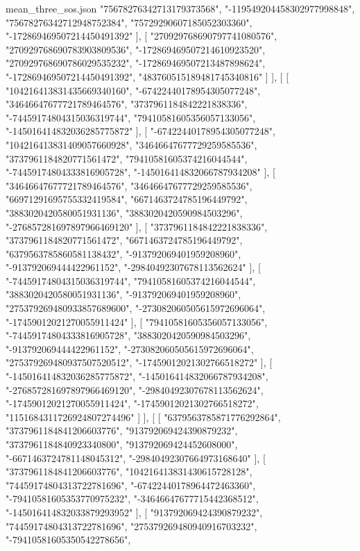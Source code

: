 \begin{filecontents*}[overwrite]{mean_three_sos.json}
    "75678276342713179373568",
    "-119549204458302977998848",
    "75678276342712948752384",
    "75729290607185052303360",
    "-172869469507214450491392"
   ],
   [
    "270929768690797741080576",
    "270929768690783903809536",
    "-172869469507214610923520",
    "270929768690786029535232",
    "-172869469507213487898624",
    "-172869469507214450491392",
    "483760515189481745340816"
   ]
  ],
  [
   [
    "104216413831435669340160",
    "-67422440178954305077248",
    "34646647677721789464576",
    "3737961184842221838336",
    "-74459174804315036319744",
    "79410581605356057133056",
    "-145016414832036285775872"
   ],
   [
    "-67422440178954305077248",
    "104216413831409057660928",
    "34646647677729259585536",
    "3737961184820771561472",
    "79410581605374216044544",
    "-74459174804333816905728",
    "-145016414832066787934208"
   ],
   [
    "34646647677721789464576",
    "34646647677729259585536",
    "66971291695755332419584",
    "6671463724785196449792",
    "3883020420580051931136",
    "3883020420590984503296",
    "-276857281697897966469120"
   ],
   [
    "3737961184842221838336",
    "3737961184820771561472",
    "6671463724785196449792",
    "6379563785860581138432",
    "-913792069401959208960",
    "-913792069444422961152",
    "-29840492307678113562624"
   ],
   [
    "-74459174804315036319744",
    "79410581605374216044544",
    "3883020420580051931136",
    "-913792069401959208960",
    "275379269480933857689600",
    "-273082060505615972696064",
    "-17459012021270055911424"
   ],
   [
    "79410581605356057133056",
    "-74459174804333816905728",
    "3883020420590984503296",
    "-913792069444422961152",
    "-273082060505615972696064",
    "275379269480937507520512",
    "-17459012021302766518272"
   ],
   [
    "-145016414832036285775872",
    "-145016414832066787934208",
    "-276857281697897966469120",
    "-29840492307678113562624",
    "-17459012021270055911424",
    "-17459012021302766518272",
    "1151684311726924807274496"
   ]
  ],
  [
   [
    "6379563785871776292864",
    "3737961184841206603776",
    "913792069424390879232",
    "3737961184840923340800",
    "913792069424452608000",
    "-6671463724781148045312",
    "-29840492307664973168640"
   ],
   [
    "3737961184841206603776",
    "104216413831430615728128",
    "74459174804313722781696",
    "-67422440178964472463360",
    "-79410581605353770975232",
    "-34646647677715442368512",
    "-145016414832033879293952"
   ],
   [
    "913792069424390879232",
    "74459174804313722781696",
    "275379269480940916703232",
    "-79410581605350542278656",

\end{filecontents*}
